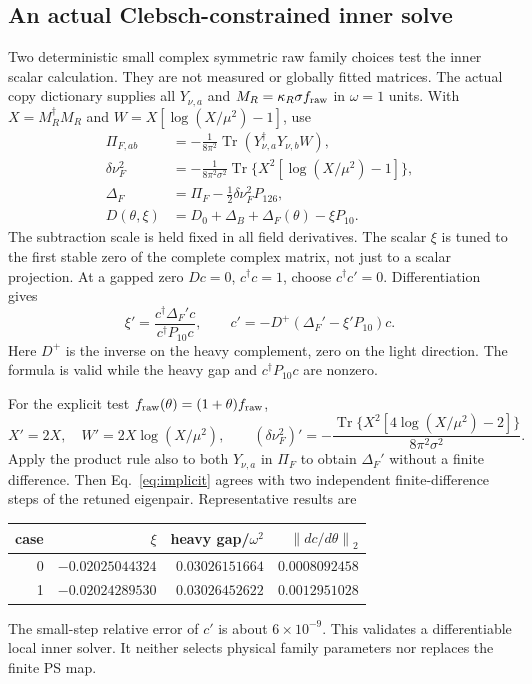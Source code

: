 \documentclass[11pt]{article}
\newcommand{\tr}{\operatorname{Tr}}
\newcommand{\norm}[1]{\left\lVert#1\right\rVert_2}
\begin{document}
\subsection{An actual Clebsch-constrained inner solve}
Two deterministic small complex symmetric raw family choices test the
inner scalar calculation. They are not measured or globally fitted
matrices. The actual copy dictionary supplies all $Y_{\nu,a}$ and
$M_R=\kappa_R\sigma f_{\rm raw}$ in $\omega=1$ units. With
$X=M_R^\dagger M_R$ and $W=X[\log(X/\mu^2)-1]$, use
\begin{align}
\Pi_{F,ab}&=-\frac1{8\pi^2}\tr(Y_{\nu,a}^\dagger Y_{\nu,b}W),\\
\delta\nu_F^2&=-\frac1{8\pi^2\sigma^2}\tr\{X^2[\log(X/\mu^2)-1]\},\\
\Delta_F&=\Pi_F-\tfrac12\delta\nu_F^2P_{126},\\
D(\theta,\xi)&=D_0+\Delta_B+\Delta_F(\theta)-\xi P_{10}.
\end{align}
The subtraction scale is held fixed in all field derivatives. The scalar
$\xi$ is tuned to the first stable zero of the complete complex matrix,
not just to a scalar projection. At a gapped zero $Dc=0$, $c^\dagger c=1$,
choose $c^\dagger c'=0$. Differentiation gives
\begin{equation}
\xi'=\frac{c^\dagger\Delta_F'c}{c^\dagger P_{10}c},\qquad
c'=-D^+(\Delta_F'-\xi'P_{10})c.
\label{eq:implicit}
\end{equation}
Here $D^+$ is the inverse on the heavy complement, zero on the light
direction. The formula is valid while the heavy gap and
$c^\dagger P_{10}c$ are nonzero.

For the explicit test $f_{\rm raw}(\theta)=(1+\theta)f_{\rm raw}$,
\begin{equation}
X'=2X,\quad W'=2X\log(X/\mu^2),\qquad
(\delta\nu_F^2)'=-\frac{\tr\{X^2[4\log(X/\mu^2)-2]\}}
{8\pi^2\sigma^2}.
\end{equation}
Apply the product rule also to both $Y_{\nu,a}$ in $\Pi_F$ to obtain
$\Delta_F'$ without a finite difference. Then Eq.~\eqref{eq:implicit}
agrees with two independent finite-difference steps of the retuned
eigenpair. Representative results are
\begin{center}
\begin{tabular}{@{}rrrr@{}}
\toprule
case&$\xi$&heavy gap/$\omega^2$&$\norm{dc/d\theta}$\\\midrule
0&$-0.02025044324$&$0.03026151664$&$0.0008092458$\\
1&$-0.02024289530$&$0.03026452622$&$0.0012951028$\\\bottomrule
\end{tabular}
\end{center}
The small-step relative error of $c'$ is about $6\times10^{-9}$.
This validates a differentiable local inner solver. It neither selects
physical family parameters nor replaces the finite PS map.
\end{document}
